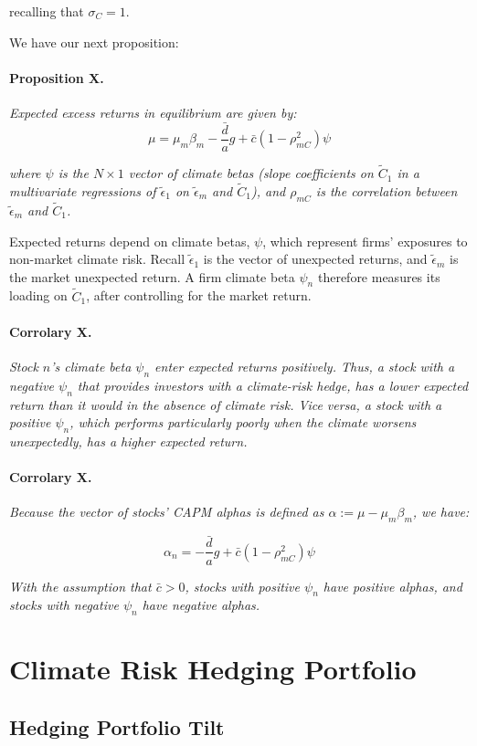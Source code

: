 recalling that $\sigma_C = 1$.

We have our next proposition:

\paragraph{Proposition X.}
\textit{Expected excess returns in equilibrium are given by:}
\begin{equation}
    \mu = \mu_m \beta_m - \frac{\bar{d}}{a}g + \bar{c}(1 - \rho^2_{mC}) \psi
\end{equation}

\textit{where $\psi$ is the $N \times 1$ vector of climate betas 
(slope coefficients on $\tilde{C}_1$ in a multivariate 
regressions of $\tilde{\epsilon}_1$ on $\tilde{\epsilon}_m$ and $\tilde{C}_1$),
and $\rho_{mC}$ is the correlation between $\tilde{\epsilon}_m$ and $\tilde{C}_1$.}


Expected returns depend on climate betas, $\psi$, which represent 
firms' exposures to non-market climate risk. 
Recall $\tilde{\epsilon}_1$ is the vector of unexpected 
returns, and $\tilde{\epsilon}_m$ is the 
market unexpected return.
A firm climate beta $\psi_n$ therefore measures 
its loading on $\tilde{C}_1$, 
after controlling for the market return. 



\paragraph{Corrolary X.}
\textit{Stock $n$'s climate beta $\psi_n$
enter expected returns positively. Thus,
a stock with a negative $\psi_n$ that 
provides investors with a climate-risk hedge,
has a lower expected return than it would in 
the absence of climate risk. Vice versa,
a stock with a positive $\psi_n$, 
which performs particularly poorly 
when the climate worsens unexpectedly, 
has a higher expected return.}


\paragraph{Corrolary X.}
\textit{Because the vector of stocks' CAPM alphas is 
defined as $\alpha := \mu - \mu_m \beta_m$, we have:}

\begin{equation}
    \alpha_n = -\frac{\bar{d}}{a}g + \bar{c}(1 - \rho^2_{mC}) \psi
\end{equation}

\textit{With the assumption that $\bar{c} > 0$, 
stocks with positive $\psi_n$ have positive alphas,
and stocks with negative $\psi_n$ have negative alphas.}

\section{Climate Risk Hedging Portfolio}

\subsection{Hedging Portfolio Tilt}


